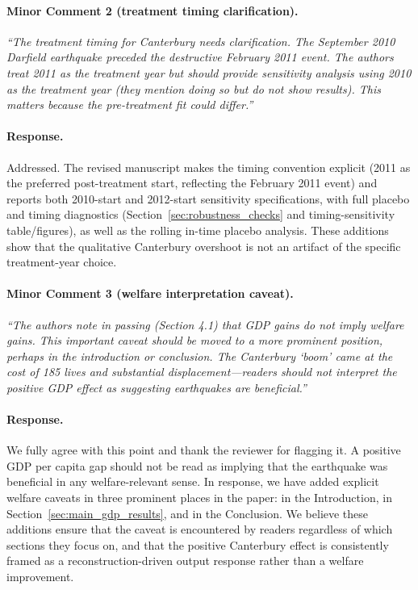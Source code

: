 \paragraph{Minor Comment 2 (treatment timing clarification).}
\textit{``The treatment timing for Canterbury needs clarification. The September 2010 Darfield earthquake preceded the destructive February 2011 event. The authors treat 2011 as the treatment year but should provide sensitivity analysis using 2010 as the treatment year (they mention doing so but do not show results). This matters because the pre-treatment fit could differ.''}

\paragraph{Response.}
Addressed. The revised manuscript makes the timing convention explicit (2011 as the preferred post-treatment start, reflecting the February 2011 event) and reports both 2010-start and 2012-start sensitivity specifications, with full placebo and timing diagnostics (Section~\ref{sec:robustness_checks} and timing-sensitivity table/figures), as well as the rolling in-time placebo analysis. These additions show that the qualitative Canterbury overshoot is not an artifact of the specific treatment-year choice.

\paragraph{Minor Comment 3 (welfare interpretation caveat).}
\textit{``The authors note in passing (Section 4.1) that GDP gains do not imply welfare gains. This important caveat should be moved to a more prominent position, perhaps in the introduction or conclusion. The Canterbury `boom' came at the cost of 185 lives and substantial displacement---readers should not interpret the positive GDP effect as suggesting earthquakes are beneficial.''}

\paragraph{Response.} We fully agree with this point and thank the reviewer for flagging it. A positive GDP per capita gap should not be read as implying that the earthquake was beneficial in any welfare-relevant sense. In response, we have added explicit welfare caveats in three prominent places in the paper: in the Introduction, in Section~\ref{sec:main_gdp_results}, and in the Conclusion. We believe these additions ensure that the caveat is encountered by readers regardless of which sections they focus on, and that the positive Canterbury effect is consistently framed as a reconstruction-driven output response rather than a welfare improvement.

